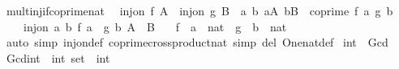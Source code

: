 \begin{isabellebody}
\isamarkupfalse%
%
\endisatagproof
{\isafoldproof}%
%
\isadelimproof
\isanewline
%
\endisadelimproof
\isanewline
{}\isamarkupfalse%
\ mult{\isacharunderscore}{\kern0pt}inj{\isacharunderscore}{\kern0pt}if{\isacharunderscore}{\kern0pt}coprime{\isacharunderscore}{\kern0pt}nat{\isacharcolon}{\kern0pt}\isanewline
\ \ {\isachardoublequoteopen}inj{\isacharunderscore}{\kern0pt}on\ f\ A\ {\isasymLongrightarrow}\ inj{\isacharunderscore}{\kern0pt}on\ g\ B\ {\isasymLongrightarrow}\ {\isacharparenleft}{\kern0pt}{\isasymAnd}a\ b{\isachardot}{\kern0pt}\ {\isasymlbrakk}a{\isasymin}A{\isacharsemicolon}{\kern0pt}\ b{\isasymin}B{\isasymrbrakk}\ {\isasymLongrightarrow}\ coprime\ {\isacharparenleft}{\kern0pt}f\ a{\isacharparenright}{\kern0pt}\ {\isacharparenleft}{\kern0pt}g\ b{\isacharparenright}{\kern0pt}{\isacharparenright}{\kern0pt}\ {\isasymLongrightarrow}\isanewline
\ \ \ \ inj{\isacharunderscore}{\kern0pt}on\ {\isacharparenleft}{\kern0pt}{\isasymlambda}{\isacharparenleft}{\kern0pt}a{\isacharcomma}{\kern0pt}\ b{\isacharparenright}{\kern0pt}{\isachardot}{\kern0pt}\ f\ a\ {\isacharasterisk}{\kern0pt}\ g\ b{\isacharparenright}{\kern0pt}\ {\isacharparenleft}{\kern0pt}A\ {\isasymtimes}\ B{\isacharparenright}{\kern0pt}{\isachardoublequoteclose}\isanewline
\ \ \ f\ {\isacharcolon}{\kern0pt}{\isacharcolon}{\kern0pt}\ {\isachardoublequoteopen}{\isacharprime}{\kern0pt}a\ {\isasymRightarrow}\ nat{\isachardoublequoteclose}\ \ g\ {\isacharcolon}{\kern0pt}{\isacharcolon}{\kern0pt}\ {\isachardoublequoteopen}{\isacharprime}{\kern0pt}b\ {\isasymRightarrow}\ nat{\isachardoublequoteclose}\isanewline
%
\isadelimproof
\ \ %
\endisadelimproof
%
\isatagproof
{}\isamarkupfalse%
\ {\isacharparenleft}{\kern0pt}auto\ simp{\isacharcolon}{\kern0pt}\ inj{\isacharunderscore}{\kern0pt}on{\isacharunderscore}{\kern0pt}def\ coprime{\isacharunderscore}{\kern0pt}crossproduct{\isacharunderscore}{\kern0pt}nat\ simp\ del{\isacharcolon}{\kern0pt}\ One{\isacharunderscore}{\kern0pt}nat{\isacharunderscore}{\kern0pt}def{\isacharparenright}{\kern0pt}%
\endisatagproof
{\isafoldproof}%
%
\isadelimproof
%
\endisadelimproof
%
\isadelimdocument
%
\endisadelimdocument
%
\isatagdocument
%
\isamarkuptrue%
%
\endisatagdocument
{\isafolddocument}%
%
\isadelimdocument
%
\endisadelimdocument
{}\isamarkupfalse%
\ int\ {\isacharcolon}{\kern0pt}{\isacharcolon}{\kern0pt}\ Gcd\isanewline
{}\isanewline
\isanewline
{}\isamarkupfalse%
\ Gcd{\isacharunderscore}{\kern0pt}int\ {\isacharcolon}{\kern0pt}{\isacharcolon}{\kern0pt}\ {\isachardoublequoteopen}int\ set\ {\isasymRightarrow}\ int{\isachardoublequoteclose}\isanewline

\end{isabellebody}
